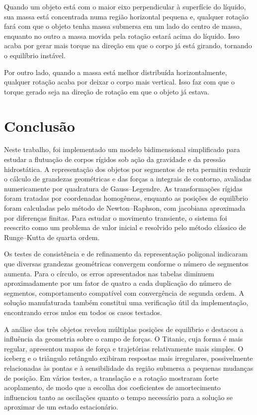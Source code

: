 \documentclass[
	12pt,				%
	oneside,			%
	a4paper,			%
	]{article}
\begin{document}
    Quando um objeto está com o maior eixo perpendicular à superfície do líquido, sua massa está concentrada numa região horizontal pequena e, qualquer rotação fará com que o objeto tenha massa submersa em um lado do centro de massa, enquanto no outro a massa movida pela rotação estará acima do líquido. Isso acaba por gerar mais torque na direção em que o corpo já está girando, tornando o equilíbrio instável.

    Por outro lado, quando a massa está melhor distribuída horizontalmente, qualquer rotação acaba por deixar o corpo mais vertical. Isso faz com que o torque gerado seja na direção de rotação em que o objeto já estava.

    \section{Conclusão}
    Neste trabalho, foi implementado um modelo bidimensional simplificado para estudar a flutuação de corpos rígidos sob ação da gravidade e da pressão hidrostática. A representação dos objetos por segmentos de reta permitiu reduzir o cálculo de grandezas geométricas e das forças a integrais de contorno, avaliadas numericamente por quadratura de Gauss--Legendre. As transformações rígidas foram tratadas por coordenadas homogêneas, enquanto as posições de equilíbrio foram calculadas pelo método de Newton--Raphson, com jacobiana aproximada por diferenças finitas. Para estudar o movimento transiente, o sistema foi reescrito como um problema de valor inicial e resolvido pelo método clássico de Runge--Kutta de quarta ordem.

    Os testes de consistência e de refinamento da representação poligonal indicaram que diversas grandezas geométricas convergem conforme o número de segmentos aumenta. Para o círculo, os erros apresentados nas tabelas diminuem aproximadamente por um fator de quatro a cada duplicação do número de segmentos, comportamento compatível com convergência de segunda ordem. A solução manufaturada também constitui uma verificação útil da implementação, encontrando erros nulos em todos os casos testados.

    A análise dos três objetos revelou múltiplas posições de equilíbrio e destacou a influência da geometria sobre o campo de forças. O Titanic, cuja forma é mais regular, apresentou mapas de força e trajetórias relativamente mais simples. O iceberg e o triângulo retângulo exibiram respostas mais irregulares, possivelmente relacionadas às pontas e à sensibilidade da região submersa a pequenas mudanças de posição. Em vários testes, a translação e a rotação mostraram forte acoplamento, de modo que a escolha dos coeficientes de amortecimento influenciou tanto as oscilações quanto o tempo necessário para a solução se aproximar de um estado estacionário.
\end{document}
